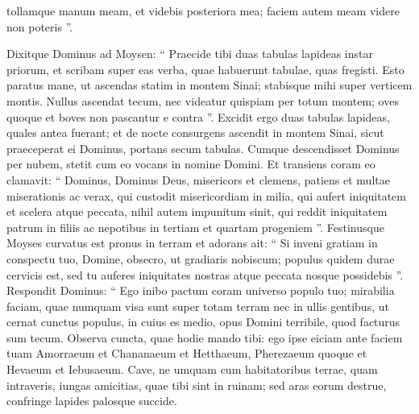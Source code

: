 \begin{biblechapter}
\begin{biblechapter}
\begin{biblechapter}
\begin{biblechapter}
\begin{biblechapter}
\begin{biblechapter}
\begin{biblechapter}
\begin{biblechapter}
\begin{biblechapter}
\begin{biblechapter}
\begin{biblechapter}
\begin{biblechapter}
\begin{biblechapter}
\begin{biblechapter}
\begin{biblechapter}
\begin{biblechapter}
\begin{biblechapter}
\begin{biblechapter}
\begin{biblechapter}
\begin{biblechapter}
\begin{biblechapter}
\begin{biblechapter}
\begin{biblechapter}
\begin{biblechapter}
\begin{biblechapter}
\begin{biblechapter}
\begin{biblechapter}
\begin{biblechapter}
\begin{biblechapter}
\begin{biblechapter}
\begin{biblechapter}
\begin{biblechapter}
\begin{biblechapter}
\verse tollamque manum meam, et videbis posteriora mea; faciem autem meam videre non poteris ”.
 
\begin{biblechapter}
\verse Dixitque Dominus ad Moysen: “ Praecide tibi duas tabulas lapideas instar priorum, et scribam super eas verba, quae habuerunt tabulae, quas fregisti. 
\verse Esto paratus mane, ut ascendas statim in montem Sinai; stabisque mihi super verticem montis. 
\verse Nullus ascendat tecum, nec videatur quispiam per totum montem; oves quoque et boves non pascantur e contra ”. 
\verse Excidit ergo duas tabulas lapideas, quales antea fuerant; et de nocte consurgens ascendit in montem Sinai, sicut praeceperat ei Dominus, portans secum tabulas.
 \verse Cumque descendisset Dominus per nubem, stetit cum eo vocans in nomine Domini. 
\verse Et transiens coram eo clamavit: “ Dominus, Dominus Deus, misericors et clemens, patiens et multae miserationis ac verax, 
\verse qui custodit misericordiam in milia, qui aufert iniquitatem et scelera atque peccata, nihil autem impunitum sinit, qui reddit iniquitatem patrum in filiis ac nepotibus in tertiam et quartam progeniem ”. 
\verse Festinusque Moyses curvatus est pronus in terram et adorans 
\verse ait: “ Si inveni gratiam in conspectu tuo, Domine, obsecro, ut gradiaris nobiscum; populus quidem durae cervicis est, sed tu auferes iniquitates nostras atque peccata nosque possidebis ”.
 \verse Respondit Dominus: “ Ego inibo pactum coram universo populo tuo; mirabilia faciam, quae numquam visa sunt super totam terram nec in ullis gentibus, ut cernat cunctus populus, in cuius es medio, opus Domini terribile, quod facturus sum tecum.
 \verse Observa cuncta, quae hodie mando tibi: ego ipse eiciam ante faciem tuam Amorraeum et Chananaeum et Hetthaeum, Pherezaeum quoque et Hevaeum et Iebusaeum. 
\verse Cave, ne umquam cum habitatoribus terrae, quam intraveris, iungas amicitias, quae tibi sint in ruinam; 
\verse sed aras eorum destrue, confringe lapides palosque succide.

\end{biblechapter}
\end{biblechapter}
\end{biblechapter}
\end{biblechapter}
\end{biblechapter}
\end{biblechapter}
\end{biblechapter}
\end{biblechapter}
\end{biblechapter}
\end{biblechapter}
\end{biblechapter}
\end{biblechapter}
\end{biblechapter}
\end{biblechapter}
\end{biblechapter}
\end{biblechapter}
\end{biblechapter}
\end{biblechapter}
\end{biblechapter}
\end{biblechapter}
\end{biblechapter}
\end{biblechapter}
\end{biblechapter}
\end{biblechapter}
\end{biblechapter}
\end{biblechapter}
\end{biblechapter}
\end{biblechapter}
\end{biblechapter}
\end{biblechapter}
\end{biblechapter}
\end{biblechapter}
\end{biblechapter}
\end{biblechapter}
